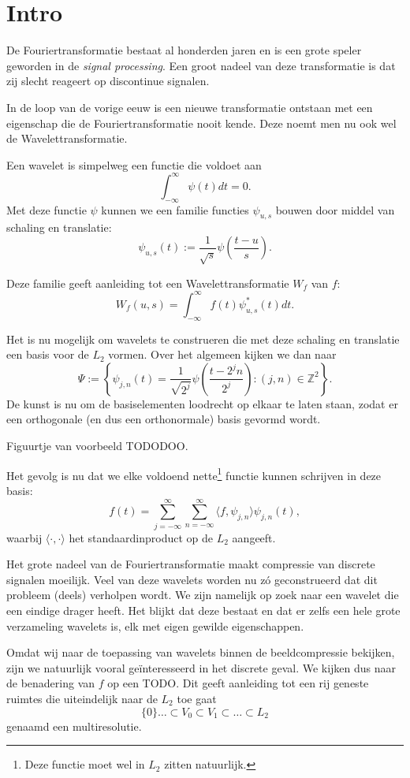 \documentclass[11pt]{amsart}
\newcommand{\Z}{\mathbb{Z}}
\begin{document}
\section{Intro}
De Fouriertransformatie bestaat al honderden jaren en is een grote speler geworden in de \emph{signal processing}. Een groot nadeel van deze transformatie is dat zij slecht reageert op discontinue signalen.

In de loop van de vorige eeuw is een nieuwe transformatie ontstaan met een eigenschap die de Fouriertransformatie nooit kende. Deze noemt men nu ook wel de Wavelettransformatie.

Een wavelet is simpelweg een functie die voldoet aan
\[
  \int_{-\infty}^{\infty} \psi(t) dt = 0.
\]
Met deze functie $\psi$ kunnen we een familie functies $\psi_{u,s}$ bouwen door middel van schaling en translatie:
\[
  \psi_{u,s}(t) := \frac{1}{\sqrt{s}} \psi\left(\frac{t-u}{s}\right).
\]

Deze familie geeft aanleiding tot een Wavelettransformatie $W_f$ van $f$:
\[
  W_f(u,s) = \int_{-\infty}^\infty f(t) \psi^*_{u,s}(t) dt.
\]

Het is nu mogelijk om wavelets te construeren die met deze schaling en translatie een basis voor de $L_2$ vormen. Over het algemeen kijken we dan naar
\[
  \Psi := \left\{ \psi_{j,n}(t) = \frac{1}{\sqrt{2^j}} \psi\left( \frac{t - 2^jn}{2^j}\right) : (j,n) \in \Z^2 \right\}.
\]
De kunst is nu om de basiselementen loodrecht op elkaar te laten staan, zodat er een orthogonale (en dus een orthonormale) basis gevormd wordt. 

Figuurtje van voorbeeld TODODOO.

Het gevolg is nu dat we elke voldoend nette\footnote{Deze functie moet wel in $L_2$ zitten natuurlijk.} functie kunnen schrijven in deze basis:
\[
  f(t) = \sum_{j=-\infty}^{\infty} \sum_{n=-\infty}^{\infty} \langle f, \psi_{j,n} \rangle \psi_{j,n}(t),
\]
waarbij $\langle \cdot, \cdot \rangle$ het standaardinproduct op de $L_2$ aangeeft.

Het grote nadeel van de Fouriertransformatie maakt compressie van discrete signalen moeilijk. Veel van deze wavelets worden nu z\'o geconstrueerd dat dit probleem (deels) verholpen wordt. We zijn namelijk op zoek naar een wavelet die een eindige drager heeft. Het blijkt dat deze bestaat en dat er zelfs een hele grote verzameling wavelets is, elk met eigen gewilde eigenschappen.

Omdat wij naar de toepassing van wavelets binnen de beeldcompressie bekijken, zijn we natuurlijk vooral ge\"interesseerd in het discrete geval. We kijken dus naar de benadering van $f$ op een TODO. Dit geeft aanleiding tot een rij geneste ruimtes die uiteindelijk naar de $L_2$ toe gaat
\begin{equation}
  \label{multires}
  \{0\} \ldots \subset V_0 \subset V_1 \subset \ldots \subset L_2
\end{equation}
genaamd een multiresolutie.
\end{document}
